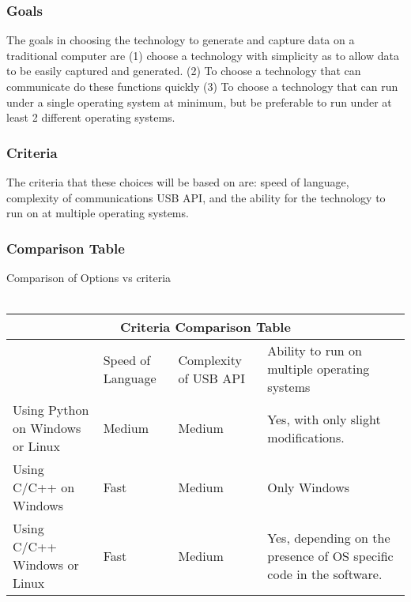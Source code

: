 \documentclass[10pt,draftclsnofoot,onecolumn]{IEEEtran}
\begin{document}
\subsubsection{Goals}
The goals in choosing the technology to generate and capture data on a traditional computer are (1) choose a technology with simplicity as to allow data to be easily captured and generated. (2) To choose a technology that can communicate do these functions quickly (3) To choose a technology that can run under a single operating system at minimum, but be preferable to run under at least 2 different operating systems. \\
\subsubsection{Criteria}
      The criteria that these choices will be based on are: speed of language, complexity of communications USB API, and the ability for the technology to run on at multiple operating systems.\\
\subsubsection{Comparison Table}
Comparison of Options vs criteria \\ \\
\begin{tabular}{ |p{2cm}|p{2cm}|p{2cm}| p{2cm}| }
\hline
\multicolumn{4}{|c|}{Criteria Comparison Table} \\
\hline
   &Speed of Language&Complexity of USB API&Ability to run on multiple operating systems\\
\hline
Using Python on Windows or Linux&Medium&Medium&Yes, with only slight modifications. \\
\hline
Using C/C++ on Windows&Fast&Medium&Only Windows \\
\hline
Using C/C++ Windows or Linux &Fast&Medium&Yes, depending on the presence of OS specific code in the software. \\
\hline
\end{tabular}
\vspace{1cm}
\end{document}
